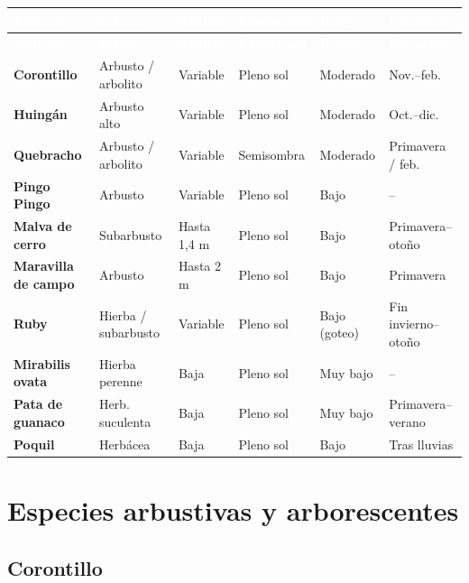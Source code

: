 \documentclass[11pt,a4paper]{article}
\newcommand{\Needspace}[1]{}
\begin{document}
\footnotesize
\renewcommand{\arraystretch}{1.35}
\setlength{\tabcolsep}{4pt}
\begin{longtable}{>{\bfseries}p{2.7cm} p{2.1cm} p{1.7cm} p{2.1cm} p{1.8cm} p{2.6cm}}
\rowcolor{ForestGreen}
\textcolor{white}{\bfseries Especie} & \textcolor{white}{\bfseries Estrato} & \textcolor{white}{\bfseries Altura} & \textcolor{white}{\bfseries Exposición} & \textcolor{white}{\bfseries Riego} & \textcolor{white}{\bfseries Floración} \\
\endfirsthead
\rowcolor{ForestGreen}
\textcolor{white}{\bfseries Especie} & \textcolor{white}{\bfseries Estrato} & \textcolor{white}{\bfseries Altura} & \textcolor{white}{\bfseries Exposición} & \textcolor{white}{\bfseries Riego} & \textcolor{white}{\bfseries Floración} \\
\endhead
Corontillo & Arbusto / arbolito & Variable & Pleno sol & Moderado & Nov.--feb. \\
Huingán & Arbusto alto & Variable & Pleno sol & Moderado & Oct.--dic. \\
Quebracho & Arbusto / arbolito & Variable & Semisombra & Moderado & Primavera / feb. \\
Pingo Pingo & Arbusto & Variable & Pleno sol & Bajo & -- \\
Malva de cerro & Subarbusto & Hasta 1,4 m & Pleno sol & Bajo & Primavera--otoño \\
Maravilla de campo & Arbusto & Hasta 2 m & Pleno sol & Bajo & Primavera \\
Ruby & Hierba / subarbusto & Variable & Pleno sol & Bajo (goteo) & Fin invierno--otoño \\
Mirabilis ovata & Hierba perenne & Baja & Pleno sol & Muy bajo & -- \\
Pata de guanaco & Herb. suculenta & Baja & Pleno sol & Muy bajo & Primavera--verano \\
Poquil & Herbácea & Baja & Pleno sol & Bajo & Tras lluvias \\
\end{longtable}
\normalsize

\section{Especies arbustivas y arborescentes}

\Needspace{7cm}
\subsection{Corontillo}
\end{document}
